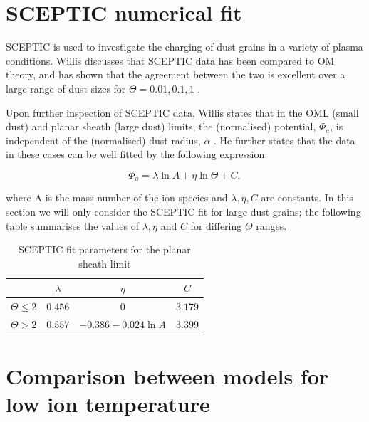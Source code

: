 \documentclass{article}
\begin{document}
    
\section{SCEPTIC numerical fit}

\smallskip

SCEPTIC is used to investigate the charging of dust grains in a variety
of plasma conditions. Willis discusses that SCEPTIC data has been compared
to OM theory, and has shown that the agreement between the two is excellent over a large range of dust sizes 
for $\Theta = 0.01,0.1,1$ \cite{ScepticFit}.

\medskip

Upon further inspection of SCEPTIC data, Willis states that in the OML (small dust)
and planar sheath (large dust) limits, the (normalised) potential, $\Phi_a$, is independent of the (normalised)
dust radius, $\alpha$ \cite{ScepticFit}. He further states that the data in these cases can
be well fitted by the following expression

\begin{equation}\label{eq:SCEPTICfit}
\Phi_a = \lambda \ln{A} + \eta \ln{\Theta} + C,
\end{equation}

\smallskip

\noindent where A is the mass number of the ion species and $\lambda, \eta, C$ are 
constants. In this section we will only consider the SCEPTIC
fit for large dust grains; the following table summarises the values of $\lambda, \eta$ and $C$
for differing $\Theta$ ranges.

\begin{table}[h!]
\begin{center}
    \caption{SCEPTIC fit parameters for the planar sheath limit}
    \label{tab:ValueTable}
    \begin{tabular}{c|c|c|c} 
    \hline
    & $\lambda$ & $\eta$ & $C$ \\
    \hline
    $\Theta \leq 2$ & $0.456$ & $0$ & $3.179$\\
    $\Theta > 2$ & $0.557$ & $-0.386 - 0.024\ln{A}$ & $3.399$\\
    \end{tabular}
\end{center}
\end{table}


\section{Comparison between models for low ion temperature}
\end{document}
